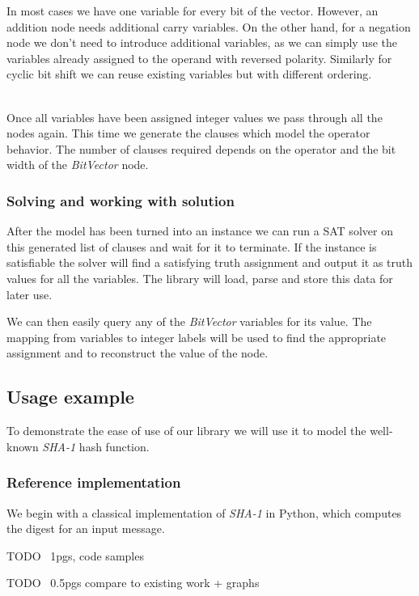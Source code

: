 In most cases we have one variable for every bit of the vector.
However, an addition node needs additional carry variables.
On the other hand, for a negation node we don't need to introduce additional variables, as we can simply use the variables already assigned to the operand with reversed polarity.
Similarly for cyclic bit shift we can reuse existing variables but with different ordering.

~\\

Once all variables have been assigned integer values we pass through all the nodes again.
This time we generate the clauses which model the operator behavior.
The number of clauses required depends on the operator and the bit width of the \emph{BitVector} node.

\subsubsection{Solving and working with solution}
After the model has been turned into an instance we can run a SAT solver on this generated list of clauses and wait for it to terminate.
If the instance is satisfiable the solver will find a satisfying truth assignment and output it as truth values for all the variables.
The library will load, parse and store this data for later use.

We can then easily query any of the \emph{BitVector} variables for its value.
The mapping from variables to integer labels will be used to find the appropriate assignment and to reconstruct the value of the node.

\subsection{Usage example}
To demonstrate the ease of use of our library we will use it to model the well-known \emph{SHA-1} hash function.

\subsubsection{Reference implementation}
We begin with a classical implementation of \emph{SHA-1} in Python, which computes the digest for an input message.

TODO ~1pgs, code samples

TODO ~0.5pgs compare to existing work + graphs